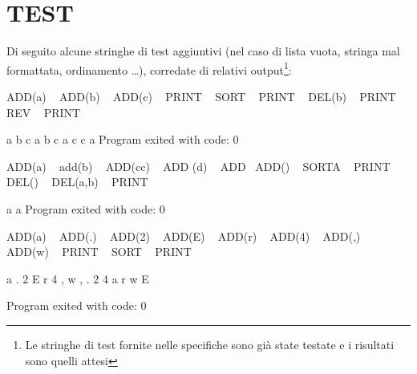 \documentclass[11pt]{report}
\begin{document}
    \chapter{TEST}
    Di seguito alcune stringhe di test aggiuntivi (nel caso di lista vuota, stringa mal formattata, ordinamento \ldots), corredate di relativi output\footnote{Le stringhe di test fornite nelle specifiche sono già state testate e i risultati sono quelli attesi}:
    
    \small
    \begin{spverbatim}
    ADD(a) ~ ADD(b) ~ ADD(c) ~ PRINT ~ SORT ~ PRINT ~ DEL(b) ~ PRINT ~ REV ~ PRINT
    
    a b c 
    a b c 
    a c 
    c a 
    Program exited with code: 0


    ADD(a) ~ add(b) ~ ADD(cc) ~ ADD (d) ~ ADD~ ADD() ~ SORTA ~ PRINT ~ DEL() ~ DEL(a,b) ~ PRINT
    
   a 
   a 
   Program exited with code: 0


    ADD(a) ~ ADD(.) ~ ADD(2) ~ ADD(E) ~ ADD(r) ~ ADD(4) ~ ADD(,) ~ ADD(w) ~ PRINT ~ SORT ~ PRINT

    
    a . 2 E r 4 , w 
    , . 2 4 a r w E 
    
    Program exited with code: 0

   
    \end{spverbatim}
    

    
    
        

    
    
\end{document}
